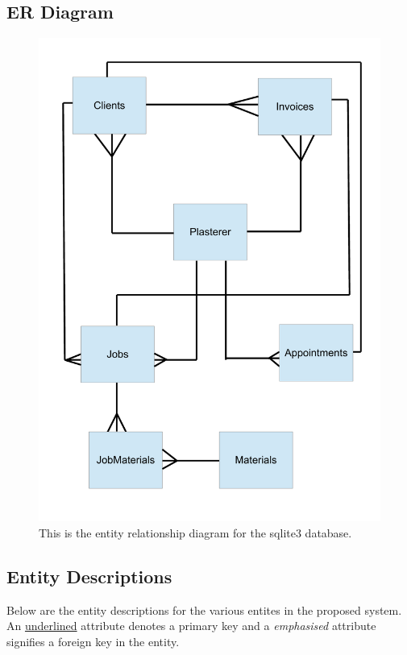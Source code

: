 \subsection{ER Diagram}

\begin{figure}[H]
    \includegraphics[width=\textwidth]{./Analysis/images/ER-Diagram.pdf}
    \caption{This is the entity relationship diagram for the sqlite3 database.} \label{fig:Entity_Relationship_Diagram}
\end{figure}


\subsection{Entity Descriptions}

\begin{flushleft}

Below are the entity descriptions for the various entites in the proposed system. An \underline{underlined} attribute denotes a primary key and a \emph{emphasised}	attribute signifies a foreign key in the entity.

\end{flushleft}




